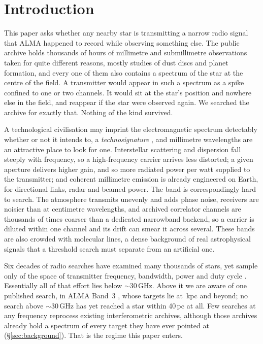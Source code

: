 \section{Introduction}
\label{sec:intro}

This paper asks whether any nearby star is transmitting a narrow radio
signal that ALMA happened to record while observing something else. The
public archive holds thousands of hours of millimetre and submillimetre
observations taken for quite different reasons, mostly studies of dust
discs and planet formation, and every one of them also contains a spectrum
of the star at the centre of the field. A transmitter would appear in such
a spectrum as a spike confined to one or two channels. It would sit at the
star's position and nowhere else in the field, and reappear if the star
were observed again. We searched the archive for exactly that. Nothing of
the kind survived.

A technological civilisation may imprint the electromagnetic spectrum
detectably whether or not it intends to, a \emph{technosignature}
\citep{Sheikh2020,SETIreview2025}, and millimetre wavelengths are an
attractive place to look for one. Interstellar scattering and dispersion
fall steeply with frequency, so a high-frequency carrier arrives less
distorted; a given aperture delivers higher gain, and so more radiated
power per watt supplied to the transmitter; and coherent millimetre
emission is already engineered on Earth, for directional links, radar and
beamed power. The band is correspondingly hard to search. The atmosphere
transmits unevenly and adds phase noise, receivers are noisier than at
centimetre wavelengths, and archived correlator channels are thousands of
times coarser than a dedicated narrowband backend, so a carrier is diluted
within one channel and its drift can smear it across several. These bands
are also crowded with molecular lines, a dense background of real
astrophysical signals that a threshold search must separate from an
artificial one.

Six decades of radio searches have examined many thousands of stars, yet
sample only \HaystackFrac{} of the space of transmitter frequency,
bandwidth, power and duty cycle \citep{Wright2018}. Essentially all of that
effort lies below ${\sim}30$\,GHz. Above it we are aware of one published
search, in ALMA Band~3 \citep{Mason2025}, whose targets lie at
\MasonNearKpc\,kpc and beyond; no search above ${\sim}30$\,GHz has yet
reached a star within 40\,pc at all. Few searches at any frequency
reprocess existing interferometric archives, although those archives
already hold a spectrum of every target they have ever pointed at
(\S\ref{sec:background}). That is the regime this paper enters.

